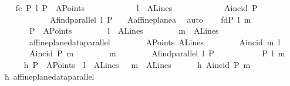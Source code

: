 \begin{isabellebody}
\ \ \isamarkupfalse%
\ f{}c{\isacharcolon}{\kern0pt}\ {\isachardoublequoteopen}{\isasymAnd}P\ l{\isachardot}{\kern0pt}\ P\ {\isasymin}\ A{}Points\ {\isasymLongrightarrow}\isanewline
\ \ \ \ \ \ \ \ \ \ \ l\ {\isasymin}\ A{}Lines\ {\isasymLongrightarrow}\isanewline
\ \ \ \ \ \ \ \ \ \ \ A{}incid\ P\isanewline
\ \ \ \ \ \ \ \ \ \ \ \ {\isacharparenleft}{\kern0pt}A{}find{\isacharunderscore}{\kern0pt}parallel\ l\ P{\isacharparenright}{\kern0pt}{\isachardoublequoteclose}\ \ \isamarkupfalse%
\ A{}affine{\isacharunderscore}{\kern0pt}plane{\isacharunderscore}{\kern0pt}a{}{\isacharparenleft}{\kern0pt}{}{\isacharparenright}{\kern0pt}\ \isamarkupfalse%
\ auto\isanewline
\ \ \isamarkupfalse%
\ f{}d{\isacharcolon}{\kern0pt}{\isachardoublequoteopen}{\isasymAnd}P\ l\ m{\isachardot}{\kern0pt}\isanewline
\ \ \ \ \ \ \ P\ {\isasymin}\ A{}Points\ {\isasymLongrightarrow}\isanewline
\ \ \ \ \ \ \ l\ {\isasymin}\ A{}Lines\ {\isasymLongrightarrow}\isanewline
\ \ \ \ \ \ \ m\ {\isasymin}\ A{}Lines\ {\isasymLongrightarrow}\isanewline
\ \ \ \ \ \ \ affine{\isacharunderscore}{\kern0pt}plane{\isacharunderscore}{\kern0pt}data{\isachardot}{\kern0pt}parallel\isanewline
\ \ \ \ \ \ \ \ A{}Points\ A{}Lines\isanewline
\ \ \ \ \ \ \ \ A{}incid\ m\ l\ {\isasymLongrightarrow}\isanewline
\ \ \ \ \ \ \ A{}incid\ P\ m\ {\isasymLongrightarrow}\isanewline
\ \ \ \ \ \ \ m\ {\isacharequal}{\kern0pt}\isanewline
\ \ \ \ \ \ \ A{}find{\isacharunderscore}{\kern0pt}parallel\ l\ P{\isachardoublequoteclose}\ \isanewline
\ \ \isamarkupfalse%
\ {\isacharminus}{\kern0pt}\isanewline
\ \ \ \ \isamarkupfalse%
\ P\ l\ m\ \isanewline
\ \ \ \ \isamarkupfalse%
\ h{}{\isacharcolon}{\kern0pt}\ {\isachardoublequoteopen}P\ {\isasymin}\ A{}Points{\isachardoublequoteclose}\ \ {\isachardoublequoteopen}l\ {\isasymin}\ A{}Lines{\isachardoublequoteclose}\ \ \ {\isachardoublequoteopen}m\ {\isasymin}\ A{}Lines{\isachardoublequoteclose}\isanewline
\ \ \ \ \isamarkupfalse%
\ h{}{\isacharcolon}{\kern0pt}\ {\isachardoublequoteopen}A{}incid\ P\ m{\isachardoublequoteclose}\isanewline
\ \ \ \ \isamarkupfalse%
\ h{}{\isacharcolon}{\kern0pt}\ {\isachardoublequoteopen}affine{\isacharunderscore}{\kern0pt}plane{\isacharunderscore}{\kern0pt}data{\isachardot}{\kern0pt}parallel\isanewline

\end{isabellebody}
